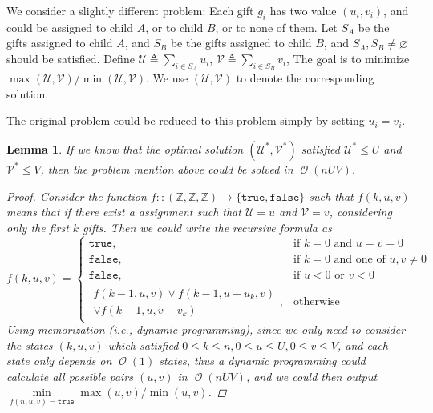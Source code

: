 \documentclass[12pt, a4paper]{article}
\newtheorem{lemma}{Lemma}
\newcommand{\defeq}{\triangleq}
\DeclareMathOperator*{\ord}{\mathcal{O}}
\begin{document}
We consider a slightly different problem: Each gift $g_i$ has two value $(u_i, v_i)$, and could be
assigned to child $A$, or to child $B$, or to none of them. Let $S_A$ be the gifts assigned to 
child $A$, and $S_B$ be the gifts assigned to child $B$, and $S_A, S_B \neq \varnothing$ should be satisfied.
Define $\mathcal{U} \defeq \sum_{i \in S_A} u_i$, $\mathcal{V} \defeq \sum_{i \in S_B} v_i$,
The goal is to minimize $\max(\mathcal{U}, \mathcal{V}) /
\min(\mathcal{U}, \mathcal{V})$. We use $(\mathcal{U}, \mathcal{V})$ to denote the corresponding solution.

The original problem could be reduced to this problem simply by setting $u_i = v_i$. \medskip

\newcommand*{\oU}{\mathcal{U}^*}
\newcommand*{\oV}{\mathcal{V}^*}
\newcommand*{\Zb}{\mathbb{Z}}
\newcommand*{\true}{\texttt{true}}
\newcommand*{\false}{\texttt{false}}
\begin{lemma} \label{lemma:dp-alg}
  If we know that the optimal solution $(\oU, \oV)$ satisfied $\oU \leq U$ and $\oV \leq V$, then
  the problem mention above could be solved in $\ord(n U V)$.

  \begin{proof}
    Consider the function $f :: (\Zb, \Zb, \Zb) \to \{ \true, \false \} $ such that
    $f(k, u, v)$ means that if there exist a assignment such that $\mathcal{U} = u$ and $\mathcal{V} = v$,
    considering only the first $k$ gifts.
    Then we could write the recursive formula as
    \[
      f(k, u, v) = 
      \begin{cases}
        \true, & \text{if } k = 0 \text{ and } u = v = 0 \\
        \false, & \text{if } k = 0 \text{ and one of } u, v \neq 0 \\
        \false, & \text{if } u < 0 \text{ or } v < 0 \\
        \begin{split} 
          f(k-1, u, v) \lor f(k-1, u-u_k, v) \\ \lor f(k-1, u, v-v_k)
        \end{split}, & \text{otherwise}
      \end{cases}
    \]
    Using memorization (i.e., dynamic programming), since we only need to consider the states $(k, u, v)$
    which satisfied $0 \leq k \leq n, 0 \leq u \leq U, 0 \leq v \leq V$, and each state only
    depends on $\ord(1)$ states, thus a dynamic programming could calculate all possible pairs $(u, v)$ in $\ord(nUV)$,
    and we could then output $\min\limits_{f(n, u, v) = \true} \max(u, v) / \min(u, v)$.
  \end{proof}
\end{lemma}
\end{document}
